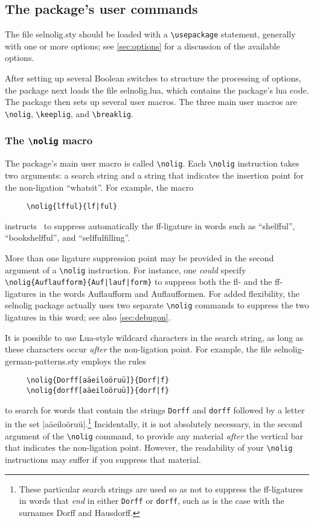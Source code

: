 \documentclass[11pt]{article}
\newcommand{\pkg}[1]{\textsf{#1}}
\newcommand{\opt}[1]{\texttt{#1}}
\newcommand{\cmmd}[1]{\texttt{\textbackslash #1}}
\begin{document}
\subsection{The package's user commands} \label{sec:syntax}

The file \pkg{selnolig.sty} should be loaded with a \cmmd{usepackage} statement, generally with one or more options; see \cref{sec:options} for a discussion of the available options. 

After setting up several Boolean switches to structure the processing of options, the package next loads the file \pkg{selnolig.lua}, which contains the package's lua code. The package then sets up several user macros. The three main user macros are \cmmd{nolig}, \cmmd{keeplig}, and \cmmd{breaklig}.



\subsubsection{The \cmmd{nolig} macro}
\label{sec:nolig}

\enlargethispage{0.3\baselineskip}

The package's main user macro is called \cmmd{nolig}. Each \cmmd{nolig} instruction takes two arguments: a search string and a string that indicates the insertion point for the non-ligation \enquote{whatsit}. For example, the macro
\begin{Verbatim}
     \nolig{lfful}{lf|ful}
\end{Verbatim}
instructs \LuaLaTeX\ to suppress automatically the ff-ligature in words such as \enquote{shelfful}, \enquote{bookshelfful}, and \enquote{selffulfilling}. 

More than one ligature suppression point may be provided in the second argument of a \cmmd{nolig} instruction. For instance, one \emph{could} specify \Verb+\nolig{Auflaufform}{Auf|lauf|form}+ to suppress both the fl- and the ff-ligatures in the words Auflaufform and Auflaufformen. For added flexibility, the \pkg{selnolig} package actually uses two separate \cmmd{nolig} commands to suppress the two ligatures in this word; see also \cref{sec:debugon}.


It is possible to use Lua-style wildcard characters in the search string, as long as these characters occur \emph{after} the non-ligation point. For example, the file \pkg{selnolig-german-patterns.sty} employs the rules 
\begin{Verbatim}
     \nolig{Dorff[aäeiloöruü]}{Dorf|f}
     \nolig{dorff[aäeiloöruü]}{dorf|f}
\end{Verbatim}
to search for words that contain the strings \opt{Dorff} and \opt{dorff} followed by a letter in the set |aäeiloöruü|.\footnote{These particular search strings are used so as not to suppress the ff-ligatures in words that \emph{end} in either \opt{Dorff} or \opt{dorff}, such as is the case with the surnames Dorff and Hausdorff.} Incidentally, it is not absolutely necessary, in the second argument of the \cmmd{nolig} command, to provide any material \emph{after} the vertical bar that indicates the non-ligation point. However, the readability of your \cmmd{nolig} instructions may suffer if you suppress that material.
\end{document}
